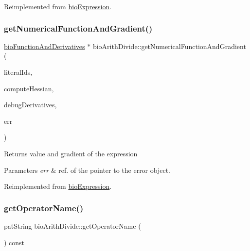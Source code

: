 Reimplemented from \hyperlink{classbio_expression_a3e4b4dca58dbbc6f0e411b30eb3f60b4}{bio\+Expression}.

\mbox{\label{classbio_arith_divide_a29465844ff4722a8d542c8a6935c2686}} 
\subsubsection{\texorpdfstring{get\+Numerical\+Function\+And\+Gradient()}{getNumericalFunctionAndGradient()}}
{\footnotesize\ttfamily \hyperlink{classbio_function_and_derivatives}{bio\+Function\+And\+Derivatives} $\ast$ bio\+Arith\+Divide\+::get\+Numerical\+Function\+And\+Gradient (\begin{DoxyParamCaption}\item[{vector$<$ pat\+U\+Long $>$}]{literal\+Ids,  }\item[{pat\+Boolean}]{compute\+Hessian,  }\item[{pat\+Boolean}]{debug\+Derivatives,  }\item[{pat\+Error $\ast$\&}]{err }\end{DoxyParamCaption})\hspace{0.3cm}{\ttfamily [virtual]}}

\begin{DoxyReturn}{Returns}
value and gradient of the expression 
\end{DoxyReturn}

\begin{DoxyParams}{Parameters}
{\em err} & ref. of the pointer to the error object. \\
\hline
\end{DoxyParams}


Reimplemented from \hyperlink{classbio_expression_a91c81ce80c9e972c913b10f5f3c1ed13}{bio\+Expression}.

\mbox{\label{classbio_arith_divide_a544e0dc66cfb2be23226a968b5d7c5cb}} 
\subsubsection{\texorpdfstring{get\+Operator\+Name()}{getOperatorName()}}
{\footnotesize\ttfamily pat\+String bio\+Arith\+Divide\+::get\+Operator\+Name (\begin{DoxyParamCaption}{ }\end{DoxyParamCaption}) const\hspace{0.3cm}{\ttfamily [virtual]}}

